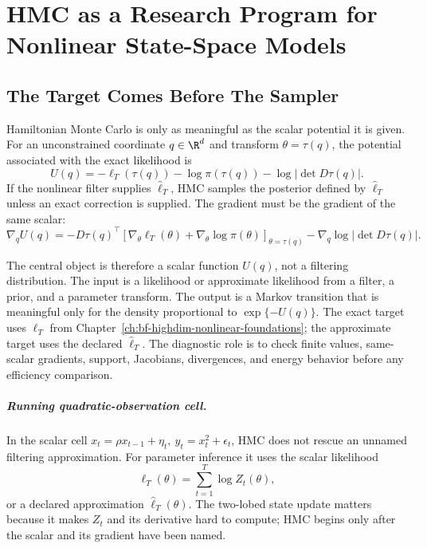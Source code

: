 \chapter[HMC Research Program For Nonlinear SSMs]{HMC as a Research Program for Nonlinear State-Space Models}
\label{ch:bf-highdim-hmc-research}

\section{The Target Comes Before The Sampler}
\label{sec:bf-hd-hmc-target}

Hamiltonian Monte Carlo is only as meaningful as the scalar potential it is
given.  For an unconstrained coordinate $q\in\R^d$ and transform
$\theta=\tau(q)$, the potential associated with the exact likelihood is
\begin{equation}
  U(q)
  =
  -\ell_T(\tau(q))-\log \pi(\tau(q))
  -\log\left|\det D\tau(q)\right|.
  \label{eq:bf-hd-hmc-potential}
\end{equation}
If the nonlinear filter supplies $\widehat\ell_T$, HMC samples the posterior
defined by $\widehat\ell_T$ unless an exact correction is supplied.  The
gradient must be the gradient of the same scalar:
\begin{equation}
  \nabla_q U(q)
  =
  -D\tau(q)^\top
  \left[
  \nabla_\theta\ell_T(\theta)+\nabla_\theta\log\pi(\theta)
  \right]_{\theta=\tau(q)}
  -\nabla_q\log|\det D\tau(q)|.
  \label{eq:bf-hd-hmc-gradient}
\end{equation}

The central object is therefore a scalar function \(U(q)\), not a filtering
distribution.  The input is a likelihood or approximate likelihood from a
filter, a prior, and a parameter transform.  The output is a Markov transition
that is meaningful only for the density proportional to \(\exp\{-U(q)\}\).  The
exact target uses \(\ell_T\) from
Chapter~\ref{ch:bf-highdim-nonlinear-foundations}; the approximate target uses
the declared \(\widehat\ell_T\).  The diagnostic role is to check finite
values, same-scalar gradients, support, Jacobians, divergences, and energy
behavior before any efficiency comparison.

\paragraph{Running quadratic-observation cell.}
In the scalar cell \(x_t=\rho x_{t-1}+\eta_t,\ y_t=x_t^2+\epsilon_t\), HMC
does not rescue an unnamed filtering approximation.  For parameter inference it
uses the scalar likelihood
\[
  \ell_T(\theta)=\sum_{t=1}^T\log Z_t(\theta),
\]
or a declared approximation \(\widehat\ell_T(\theta)\).  The two-lobed state
update matters because it makes \(Z_t\) and its derivative hard to compute;
HMC begins only after the scalar and its gradient have been named.

